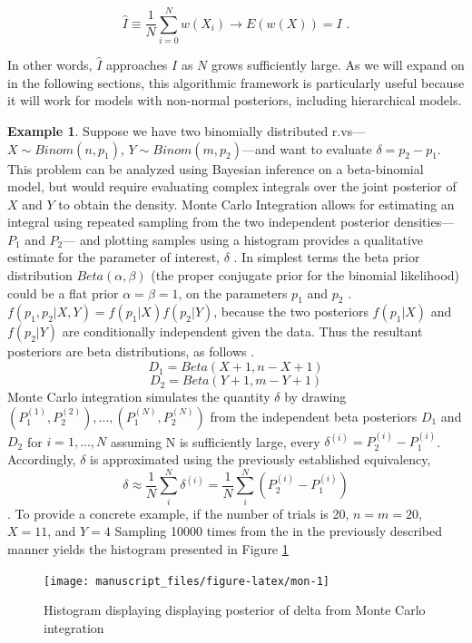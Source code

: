 \documentclass[
  12pt,
]{book}
\theoremstyle{definition}
\theoremstyle{definition}
\newtheorem{example}{Example}[chapter]
\theoremstyle{definition}
\theoremstyle{remark}
\begin{document}
\[\hat{I}\equiv\frac{1}{N}\sum_{i=0}^{N}w(X_{i})\rightarrow E(w(X))=I \textrm{ .}\]

In other words, \(\hat{I}\) approaches \(I\) as \(N\) grows sufficiently large.
As we will expand on in the following sections, this algorithmic framework is particularly useful because it will work for models with non-normal posteriors, including hierarchical models.

\begin{example}
\protect\hypertarget{exm:montecarl}{}{\label{exm:montecarl} }Suppose we have two binomially distributed r.vs---\(X \sim Binom(n,p_1)\), \(Y \sim Binom(m,p_2)\)---and want to evaluate \(\delta = p_2 - p_1\).
This problem can be analyzed using Bayesian inference on a beta-binomial model, but would require evaluating complex integrals over the joint posterior of \(X\) and \(Y\) to obtain the density.
Monte Carlo Integration allows for estimating an integral using repeated sampling from the two independent posterior densities---\(P_1\) and \(P_2\)--- and plotting samples using a histogram provides a qualitative estimate for the parameter of interest, \(\delta\) \citep{Wasserman2004}.
In simplest terms the beta prior distribution \(Beta(\alpha, \beta)\) (the proper conjugate prior for the binomial likelihood) could be a flat prior \(\alpha = \beta = 1\), on the parameters \(p_1\) and \(p_2\) \citep{Bloom2014}.
\(f(p_1,p_2|X,Y)=f(p_1|X)f(p_2|Y)\), because the two posteriors \(f(p_1|X)\) and \(f(p_2|Y)\) are conditionally independent given the data.
Thus the resultant posteriors are beta distributions, as follows \citep{Bloom2014}.
\[D_1 = Beta(X+1,n-X+1)\]
\[D_2 = Beta(Y+1,m-Y+1)\]
Monte Carlo integration simulates the quantity \(\delta\) by drawing \((P_1^{(1)},P_2^{(2)}),...,(P_1^{(N)},P_2^{(N)})\) from the independent beta posteriors \(D_1\) and \(D_2\) for \(i=1,...,N\) assuming N is sufficiently large, every \(\delta^{(i)}=P_2^{(i)} - P_1^{(i)}\).
Accordingly, \(\delta\) is approximated using the previously established equivalency, \[\delta \approx \frac{1}{N} \sum_i^N \delta^{(i)} = \frac{1}{N} \sum_i^N (P_2^{(i)} - P_1^{(i)})\] \citep{Wasserman2004}.
To provide a concrete example, if the number of trials is 20, \(n=m=20\), \(X = 11\), and \(Y = 4\) Sampling 10000 times from the in the previously described manner yields the histogram presented in Figure \ref{fig:mon}
\end{example}

\begin{figure}

{\centering \texttt{[image: manuscript\_files/figure-latex/mon-1]} 

}

\caption{Histogram displaying displaying posterior of delta from Monte Carlo integration}\label{fig:mon}
\end{figure}
\end{document}
